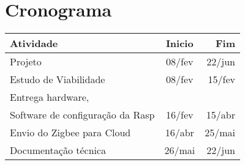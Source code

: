 \documentclass{acm_proc_article-sp}
\begin{document}
\section{Cronograma}


\begin{table}[h!]
\centering
\begin{tabular}{l|c|r}
\\Atividade & Inicio & Fim \\
\hline
Projeto & 08/fev & 22/jun \\
\hline
Estudo de Viabilidade & 08/fev & 15/fev \\
Entrega hardware, & & \\
Software de configuração da Rasp & 16/fev & 15/abr \\
Envio do Zigbee para Cloud & 16/abr & 25/mai \\
Documentação técnica & 26/mai & 22/jun \\
\end{tabular}
\label{tab:my_label}
\end{table}
\end{document}
